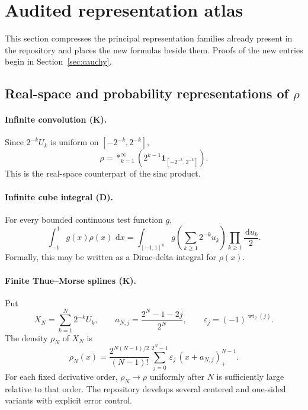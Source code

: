 \documentclass[11pt]{article}
\theoremstyle{definition}
\theoremstyle{remark}
\newcommand{\N}{\mathbb N}
\newcommand{\dd}{\,\mathrm d}
\newcommand{\wt}{\operatorname{wt}_2}
\newcommand{\eps}{\varepsilon}
\newcommand{\one}{\mathbf 1}
\newcommand{\statusknown}{\textsf{K}}
\newcommand{\statusderived}{\textsf{D}}
\begin{document}
\section{Audited representation atlas}

This section compresses the principal representation families already present in the
repository and places the new formulas beside them.  Proofs of the new entries begin in
Section~\ref{sec:cauchy}.

\subsection{Real-space and probability representations of \(\rho\)}

\paragraph{Infinite convolution (\statusknown).}
Since \(2^{-k}U_k\) is uniform on \([-2^{-k},2^{-k}]\),
\begin{equation}
 \rho=\mathop{\ast}_{k=1}^{\infty}
 \left(2^{k-1}\one_{[-2^{-k},2^{-k}]}\right).                \label{eq:rho-convolution}
\end{equation}
This is the real-space counterpart of the sinc product.

\paragraph{Infinite cube integral (\statusderived).}
For every bounded continuous test function \(g\),
\begin{equation}
 \int_{-1}^{1}g(x)\rho(x)\,\dd x
 =\int_{[-1,1]^{\N}}g\!\left(\sum_{k\ge1}2^{-k}u_k\right)
   \prod_{k\ge1}\frac{\dd u_k}{2}.                           \label{eq:cube-pushforward}
\end{equation}
Formally, this may be written as a Dirac-delta integral for \(\rho(x)\).

\paragraph{Finite Thue--Morse splines (\statusknown).}
Put
\begin{equation}
 X_N=\sum_{k=1}^{N}2^{-k}U_k,
 \qquad
 a_{N,j}=\frac{2^N-1-2j}{2^N},
 \qquad
 \eps_j=(-1)^{\wt(j)}.                                      \label{eq:aNj}
\end{equation}
The density \(\rho_N\) of \(X_N\) is
\begin{equation}
 \rho_N(x)=\frac{2^{N(N-1)/2}}{(N-1)!}
 \sum_{j=0}^{2^N-1}\eps_j\,(x+a_{N,j})_+^{N-1}.             \label{eq:finite-spline}
\end{equation}
For each fixed derivative order, \(\rho_N\to\rho\) uniformly after \(N\) is sufficiently
large relative to that order.  The repository develops several centered and one-sided
variants with explicit error control.
\end{document}

